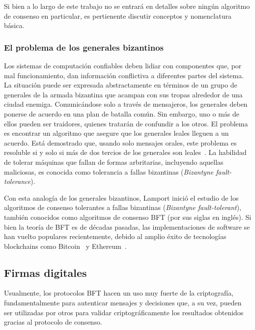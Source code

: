 %

Si bien a lo largo de este trabajo no se entrará en detalles sobre ningún algoritmo de consenso en particular,
es pertienente discutir conceptos y nomenclatura básica.

\subsubsection{El problema de los generales bizantinos}

Los sistemas de computación confiables deben lidiar con componentes que, por mal funcionamiento,
dan información conflictiva a diferentes partes del sistema.
La situación puede ser expresada abstractamente
en términos de un grupo de generales de la armada bizantina que acampan con sus tropas alrededor de una
ciudad enemiga.
Comunicándose solo a través de mensajeros, los generales deben ponerse de acuerdo en una plan
de batalla común.
Sin embargo, uno o más de ellos pueden ser traidores, quienes tratarán de confundir a los
otros.
El problema es encontrar un algoritmo que asegure que los generales leales lleguen a un acuerdo.
Está demostrado que, usando solo mensajes orales, este problema es resoluble si y solo si más de dos tercios
de los generales son leales~\cite{byzantineproblem}.
La habilidad de tolerar máquinas que fallan de formas arbritarias, incluyendo aquellas maliciosas,
es conocida como tolerancia a fallas bizantinas (\textit{Bizantyne fault-tolerance}).

%

Con esta analogía de los generales bizantinos, Lamport inició el estudio de los algoritmos de consenso tolerantes a fallas
bizantinas (\textit{Bizantyne fault-tolerant}), también conocidos como algoritmos de consenso BFT (por sus siglas en inglés).
Si bien la teoría de
BFT es de décadas pasadas, las implementaciones de software se han vuelto populares recientemente,
debido al amplio éxito de tecnologías blockchains como Bitcoin~\cite{nakamoto06bitcoin} y Ethereum~\cite{ethereum}.

\subsection{Firmas digitales}\label{subsec:signatures}
Usualmente, los protocolos BFT hacen un uso muy fuerte de la criptografía, fundamentalmente para autenticar
mensajes y decisiones que, a su vez, pueden ser utilizadas por otros para validar criptográficamente los resultados
obtenidos gracias al protocolo de consenso.


